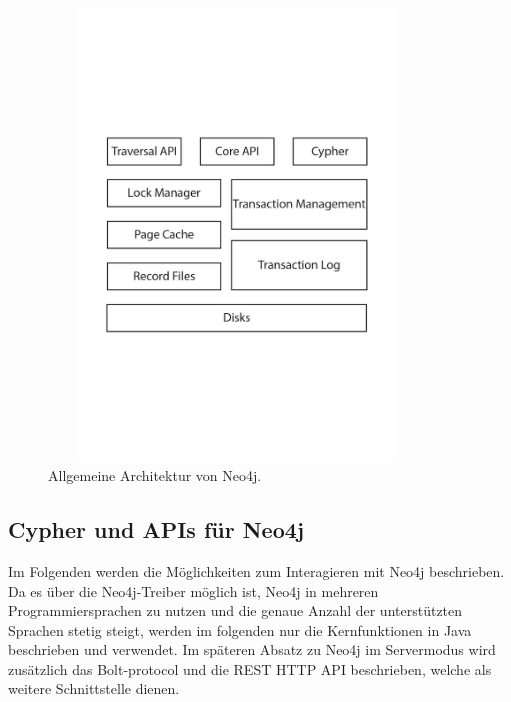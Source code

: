 \begin{figure}[H]
	\centering
	\includegraphics [width=10cm, height=12cm]{Figures/Architecure}
	\caption[Architecture]{Allgemeine Architektur von Neo4j.}
	\label{fig:Architecure}
\end{figure}

\subsection{Cypher und APIs für Neo4j}
Im Folgenden werden die Möglichkeiten zum Interagieren mit Neo4j beschrieben. Da es über die Neo4j-Treiber möglich ist, Neo4j in mehreren Programmiersprachen zu nutzen und die genaue Anzahl der unterstützten Sprachen stetig steigt, werden im folgenden nur die Kernfunktionen in Java beschrieben und verwendet. Im späteren Absatz zu Neo4j im Servermodus wird zusätzlich das Bolt-protocol und die REST HTTP API beschrieben, welche als weitere Schnittstelle dienen.

